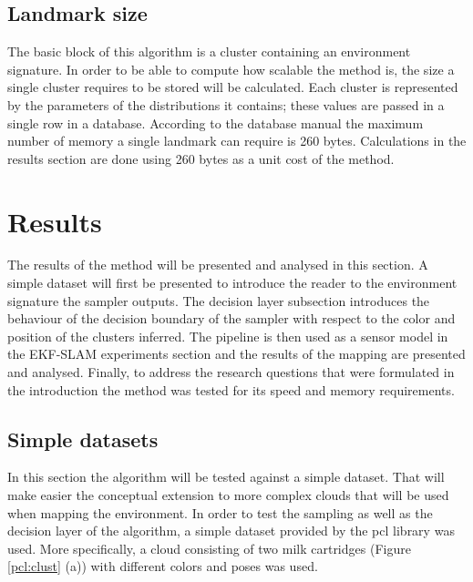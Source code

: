 \documentclass [twoside,hidelinks]{article}
\begin{document}
\subsection{Landmark size}


The basic block of this algorithm is a cluster containing an environment signature. In order to be able to compute how scalable the method is, the size a single cluster requires to be stored will be calculated. Each cluster is represented by the parameters of the distributions it contains; these values are passed in a single row in a database\cite{sqlite}. According to the database manual the maximum number of memory a single landmark can require is 260 bytes. Calculations in the results section are done using 260 bytes as a unit cost of the method. 

\newpage
\section{Results}
\label{sec:results}

The results of the method will be presented and analysed in this section. A simple dataset will first be presented to introduce the reader to the environment signature the sampler outputs. The decision layer subsection introduces the behaviour of the decision boundary of the sampler with respect to the color and position of the clusters inferred. The pipeline is then used as a sensor model in the EKF-SLAM experiments section and the results of the mapping are presented and analysed. Finally, to address the research questions that were formulated in the introduction the method was tested for its speed and memory requirements.


\subsection{Simple datasets}

In this section the algorithm will be tested against a simple dataset. That will make easier the conceptual extension to more complex clouds that will be used when mapping the environment. In order to test the sampling as well as the decision layer of the algorithm, a simple dataset provided by the pcl\cite{pcl} library was used. More specifically, a cloud consisting of two milk cartridges (Figure  \ref{pcl:clust} (a)) with different colors and poses was used. 
\end{document}
